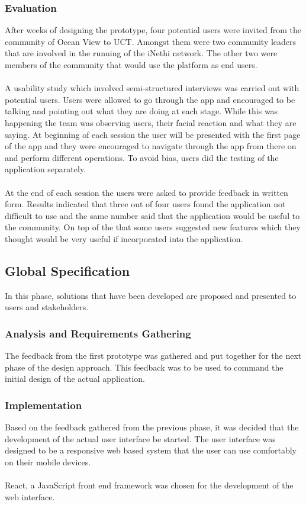 \subsubsection{Evaluation}
After weeks of designing the prototype, four potential users were invited from the community of Ocean View to UCT. Amongst them were two community leaders that are involved in the running of the iNethi network. The other two were members of the community that would use the platform as end users.
\paragraph{}
A usability study which involved semi-structured interviews was carried out with potential users. Users were allowed to go through the app and encouraged to be talking and pointing out what they are doing at each stage. While this was happening the team was observing users, their facial reaction and what they are saying. At beginning of each session the user will be presented with the first page of the app and they were encouraged to navigate through the app from there on and perform different operations. To avoid bias, users did the testing of the application separately.
\paragraph{}
At the end of each session the users were asked to provide feedback in written form. Results indicated that three out of four users found the application not difficult to use and the same number said that the application would be useful to the community. On top of the that some users suggested new features which they thought would be very useful if incorporated into the application.

\subsection{Global Specification}
In this phase, solutions that have been developed are proposed and presented to users and stakeholders\cite{Kulykinbook}.
\subsubsection{Analysis and Requirements Gathering}
The feedback from the first prototype was gathered and put together for the next phase of the design approach. This feedback was to be used to command the initial design of the actual application.
\subsubsection{Implementation}
Based on the feedback gathered from the previous phase, it was decided that the development of the actual user interface be started. The user interface was designed to be a responsive web based system that the user can use comfortably on their mobile devices.
\paragraph{}
React, a JavaScript front end framework was chosen for the development of the web interface.

